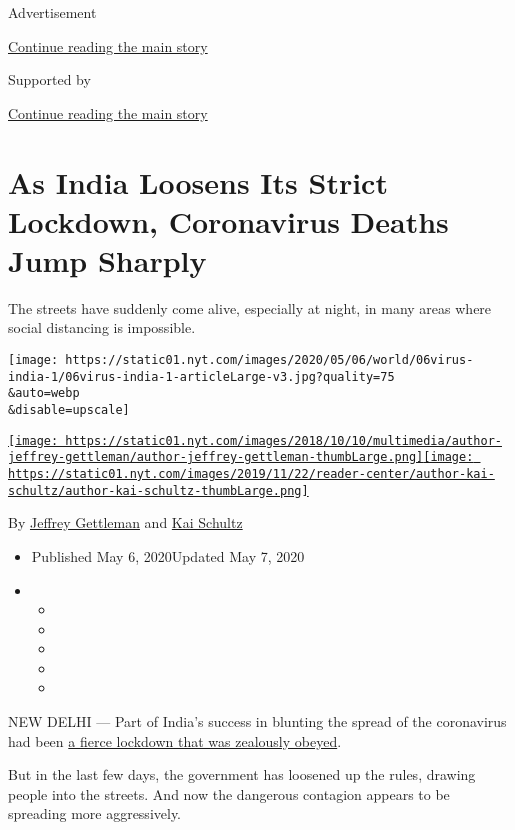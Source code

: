 Advertisement

\protect\hyperlink{after-top}{Continue reading the main story}

Supported by

\protect\hyperlink{after-sponsor}{Continue reading the main story}

\hypertarget{as-india-loosens-its-strict-lockdown-coronavirus-deaths-jump-sharply}{%
\section{As India Loosens Its Strict Lockdown, Coronavirus Deaths Jump
Sharply}\label{as-india-loosens-its-strict-lockdown-coronavirus-deaths-jump-sharply}}

The streets have suddenly come alive, especially at night, in many areas
where social distancing is impossible.

\texttt{[image: https://static01.nyt.com/images/2020/05/06/world/06virus-india-1/06virus-india-1-articleLarge-v3.jpg?quality=75\\\&auto=webp\\\&disable=upscale]}

\href{https://www.nytimes.com/by/jeffrey-gettleman}{\texttt{[image: https://static01.nyt.com/images/2018/10/10/multimedia/author-jeffrey-gettleman/author-jeffrey-gettleman-thumbLarge.png]}}\href{https://www.nytimes.com/by/kai-schultz}{\texttt{[image: https://static01.nyt.com/images/2019/11/22/reader-center/author-kai-schultz/author-kai-schultz-thumbLarge.png]}}

By \href{https://www.nytimes.com/by/jeffrey-gettleman}{Jeffrey
Gettleman} and \href{https://www.nytimes.com/by/kai-schultz}{Kai
Schultz}

\begin{itemize}
\item
  Published May 6, 2020Updated May 7, 2020
\item
  \begin{itemize}
  \item
  \item
  \item
  \item
  \item
  \end{itemize}
\end{itemize}

NEW DELHI --- Part of India's success in blunting the spread of the
coronavirus had been
\href{https://www.nytimes.com/2020/05/01/world/asia/india-coronavirus-delhi.html}{a
fierce lockdown that was zealously obeyed}.

But in the last few days, the government has loosened up the rules,
drawing people into the streets. And now the dangerous contagion appears
to be spreading more aggressively.

